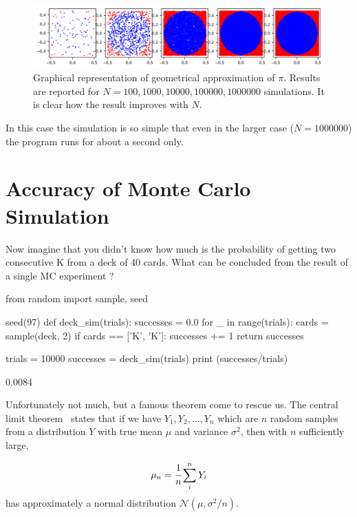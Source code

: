 \begin{figure}[htb]
\centering
\includegraphics[width=1\textwidth]{figures/mc_vs_n_experiments}
\caption{Graphical representation of geometrical approximation of $\pi$. Results are reported for $N = 100, 1000, 10000, 100000, 1000000$ simulations. It is clear how the result improves with $N$.}
\label{fig:circle_approx}
\end{figure}

In this case the simulation is so simple that even in the larger case ($N=1000000$) the program runs for about a second only.

\section{Accuracy of Monte Carlo Simulation}
\label{sec:confidence_interval}

Now imagine that you didn't know how much is the probability of getting two consecutive K from a deck of 40 cards. What can be concluded from the result of a single MC experiment ?
    
\begin{ipython}
from random import sample, seed

seed(97)
def deck_sim(trials):
    successes = 0.0
    for _ in range(trials):
        cards = sample(deck, 2)
        if cards == ['K', 'K']:
            successes += 1
    return successes

trials = 10000
successes = deck_sim(trials)
print (successes/trials)
\end{ipython}
\begin{ioutput}
0.0084
\end{ioutput}

Unfortunately not much, but a famous theorem come to rescue us.
The central limit theorem~\cite{bib:central_limit} states that if we have \(Y_1, Y_2,\dots, Y_n\) which are $n$ random samples from a distribution \(Y\) with true mean \(\mu\) and variance \(\sigma^{2}\), then with \(n\) sufficiently large,

\begin{equation*} 
\mu_n = \cfrac{1}{n}\sum_i^n Y_i
\end{equation*}
has approximately a normal distribution \(\mathcal{N}(\mu, \sigma^2/n)\).

